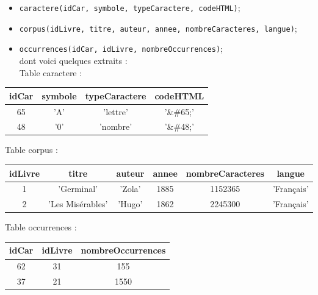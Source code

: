 \begin{itemize}
  \item \lstinline{caractere(idCar, symbole, typeCaractere, codeHTML)};
  \item \lstinline{corpus(idLivre, titre, auteur, annee, nombreCaracteres, langue)};
  \item \lstinline{occurrences(idCar, idLivre, nombreOccurrences)};\\
dont voici quelques extraits :\\
Table caractere :
\end{itemize}

\begin{center}
\begin{tabular}{|c|c|c|c|}
\hline
idCar & symbole & typeCaractere & codeHTML \\
\hline\hline
65 & 'A' & 'lettre' & '\&\#65;' \\
48 & '0' & 'nombre' & '\&\#48;' \\
\end{tabular}
\end{center}

Table corpus :

\begin{center}
\begin{tabular}{|c|c|c|c|c|c|}
\hline
idLivre & titre & auteur & annee & nombreCaracteres & langue \\
\hline\hline
1 & 'Germinal' & 'Zola' & 1885 & 1152365 & 'Français' \\
2 & 'Les Misérables' & 'Hugo' & 1862 & 2245300 & 'Français' \\
\end{tabular}
\end{center}

Table occurrences :

\begin{center}
\begin{tabular}{|c|c|c|}
\hline
idCar & idLivre & nombreOccurrences \\
\hline\hline
62 & 31 & 155 \\
37 & 21 & 1550 \\
\end{tabular}
\end{center}



